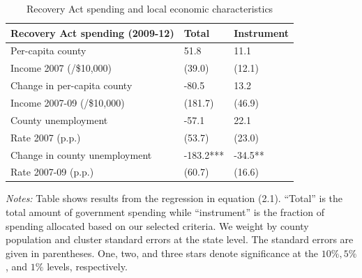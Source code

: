 \documentclass[\latexroot/\projectname]{subfiles}
\begin{document}
\begin{table}[h]
  \centering
  \caption{Recovery Act spending and local economic characteristics\whenintegrated{\label{tab:data-recovery-local-econ}}}
  \begin{tabular}{lll}
    \hline
    \textbf{Recovery Act spending (2009-12)} & \textbf{Total} & \textbf{Instrument} \\
    \hline
    Per-capita county & 51.8 & 11.1 \\
    \hspace{1em} Income 2007 (/\$10,000) & (39.0) & (12.1) \\
    Change in per-capita county & -80.5 & 13.2 \\
    \hspace{1em} Income 2007-09 (/\$10,000) & (181.7) & (46.9) \\
    County unemployment & -57.1 & 22.1 \\
    \hspace{1em} Rate 2007 (p.p.) & (53.7) & (23.0) \\
    Change in county unemployment & -183.2*** & -34.5** \\
    \hspace{1em} Rate 2007-09 (p.p.) & (60.7) & (16.6) \\
    \hline
  \end{tabular}
  \begin{flushleft}
    \footnotesize
    \textit{Notes:} Table shows results from the regression in equation (2.1). ``Total'' is the total amount of government spending while ``instrument'' is the fraction of spending allocated based on our selected criteria. We weight by county population and cluster standard errors at the state level. The standard errors are given in parentheses. One, two, and three stars denote significance at the $10 \%, 5 \%$, and $1 \%$ levels, respectively.
  \end{flushleft}
\end{table}

\smartbib
\end{document}
